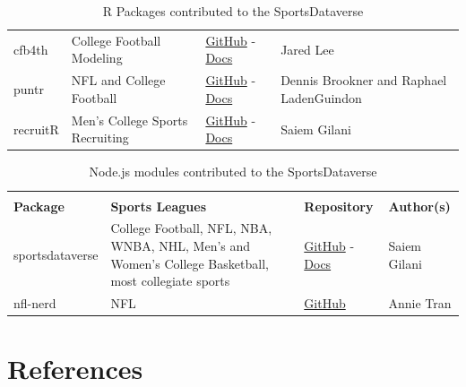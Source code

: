 \documentclass[12pt]{article}
\begin{document}
\begin{table}[!htbp]
\begin{tabular}{>{\raggedright}m{1.0in} >{\raggedright}m{2.2in} >{\centering}m{0.8in} >{\raggedright\arraybackslash}m{2.0in}}
    cfb4th & College Football Modeling & \href{https://github.com/kazink36/cfb4th}{GitHub} - \href{https://kazink36.github.io/cfb4th}{Docs} & Jared Lee \\
    puntr & NFL and College Football & \href{https://github.com/Puntalytics/puntr}{GitHub} - \href{https://puntalytics.github.io/puntr/}{Docs} & Dennis Brookner and Raphael LadenGuindon \\
    recruitR & Men's College Sports Recruiting & \href{https://github.com/saiemgilani/recruitR/}{GitHub} - \href{https://saiemgilani.github.io/recruitR/}{Docs} & Saiem Gilani \\
\bottomrule 
\end{tabular}
\vspace{5pt}
\caption{R Packages contributed to the SportsDataverse}
\label{tbl:sdvr}
\vspace{-7mm}
\end{table}
\begin{table}[!htbp]
\centering
\renewcommand{\arraystretch}{1.3}
\begin{tabular}{>{\raggedright}m{1.0in} >{\raggedright}m{2.2in} >{\centering}m{0.8in} >{\raggedright\arraybackslash}m{2.0in}}
\toprule
\multicolumn{4}{c}{\textbf{Node.js Packages in the SportsDataverse}} \\
\textbf{Package} & \textbf{Sports Leagues} & \textbf{Repository} & \textbf{Author(s)} \\ 
 \midrule
    sportsdataverse & College Football, NFL, NBA, WNBA, NHL, Men's and Women's College Basketball, most collegiate sports & \href{https://github.com/saiemgilani/sportsdataverse}{GitHub} - \href{https://saiemgilani.github.io/sportsdataverse}{Docs} & Saiem Gilani\\
    nfl-nerd & NFL & \href{https://github.com/nntrn/nfl-nerd}{GitHub} & Annie Tran \\
\end{tabular}
\vspace{5pt}
\caption{Node.js modules contributed to the SportsDataverse}
\label{tbl:sdvjs}
\vspace{-7mm}
\end{table}
\newpage
\section{References}
\printbibliography[title={\hspace{5pt}\vspace{-10pt}}]
\end{document}
